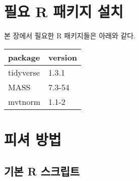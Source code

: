 \documentclass[
]{book}
\begin{document}
\hypertarget{da-packages-install}{%
\section{필요 R 패키지 설치}\label{da-packages-install}}

본 장에서 필요한 R 패키지들은 아래와 같다.

\begin{tabular}{l|l}
\hline
package & version\\
\hline
tidyverse & 1.3.1\\
\hline
MASS & 7.3-54\\
\hline
mvtnorm & 1.1-2\\
\hline
\end{tabular}

\hypertarget{da-fisher}{%
\section{피셔 방법}\label{da-fisher}}

\hypertarget{da-fisher-basic-script}{%
\subsection{기본 R 스크립트}\label{da-fisher-basic-script}}
\end{document}
